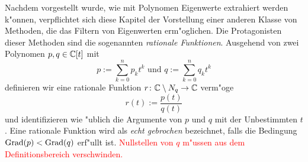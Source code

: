 Nachdem vorgestellt wurde, wie mit Polynomen Eigenwerte extrahiert werden k"onnen,
verpflichtet sich diese Kapitel der Vorstellung einer anderen Klasse von Methoden, die
das Filtern von Eigenwerten erm"oglichen. Die Protagonisten dieser Methoden sind
die sogenannten \emph{rationale Funktionen}. Ausgehend
von zwei Polynomen $p, q\in\mathbb{C} [t]$ mit
\[
p := \sum_{k=0}^n p_k t^k \text{ \ und\ } q := \sum_{k=0}^n q_k t^k
\]
definieren wir eine rationale Funktion $r\colon\mathbb{C}\setminus{N_q}\to\mathbb{C}$ verm"oge
\[
r(t) := \frac{p(t)}{q(t)}
\]
und identifizieren wie "ublich die Argumente von $p$ und $q$ mit der Unbestimmten $t$.
Eine rationale Funktion wird als \emph{echt gebrochen} bezeichnet, falls die
Bedingung $\operatorname{Grad}(p) < \operatorname{Grad}(q)$ erf"ullt ist.
\textcolor{red}{Nullstellen von $q$ m"ussen aus dem Definitionsbereich verschwinden.}

